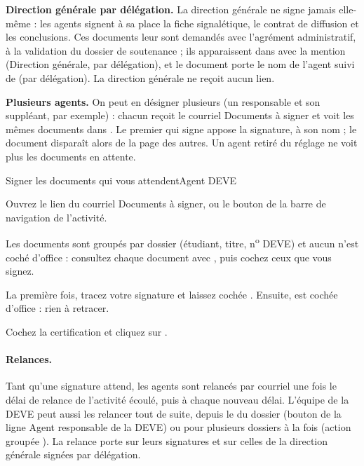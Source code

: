 \documentclass[11pt,a4paper]{article}
\begin{document}
\begin{astuce}
\textbf{Direction générale par délégation.} La direction générale ne signe
jamais elle-même : les agents signent à sa place la fiche signalétique, le
contrat de diffusion et les conclusions. Ces documents leur sont demandés avec l'agrément administratif, à la validation du
dossier de soutenance ; ils apparaissent dans  avec la
mention \og (Direction générale, par délégation)\fg{}, et le document porte le
nom de l'agent suivi de \og (par délégation)\fg{}. La direction générale ne
reçoit aucun lien.
\end{astuce}

\begin{astuce}
\textbf{Plusieurs agents.} On peut en désigner plusieurs (un responsable et son
suppléant, par exemple) : chacun reçoit le courriel \og Documents à signer\fg{}
et voit les mêmes documents dans . Le premier qui signe
appose la signature, à son nom ; le document disparaît alors de la page des
autres. Un agent retiré du réglage ne voit plus les documents en attente.
\end{astuce}

\begin{procedure}{Signer les documents qui vous attendent}{Agent DEVE}
\begin{etapes}
  \item Ouvrez le lien du courriel \og Documents à signer\fg{}, ou le bouton
         de la barre de navigation de l'activité.
  \item Les documents sont groupés par dossier (étudiant, titre, n\textsuperscript{o}
        DEVE) et aucun n'est coché d'office : consultez chaque document avec
        , puis cochez ceux que vous signez.
  \item La première fois, tracez votre signature et laissez cochée
        .
        Ensuite,  est cochée d'office :
        rien à retracer.
  \item Cochez la certification et cliquez sur .
\end{etapes}
\end{procedure}

\paragraph{Relances.} Tant qu'une signature attend, les agents sont relancés par
courriel une fois le délai de relance de l'activité écoulé, puis à chaque
nouveau délai. L'équipe de la DEVE peut aussi les relancer tout de suite, depuis
le  du dossier (bouton  de la
ligne \og Agent responsable de la DEVE\fg{}) ou pour plusieurs dossiers à la
fois (action groupée ). La relance porte sur
leurs signatures et sur celles de la direction générale signées par
délégation.
\end{document}
